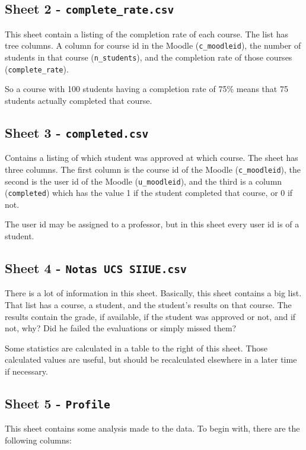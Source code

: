 \subsection{Sheet 2 - \texttt{complete\_rate.csv}}

This sheet contain a listing of the completion rate of each course. The list
has tree columns. A column for course id in the Moodle (\texttt{c\_moodleid}),
the number of students in that course (\texttt{n\_students}), and the
completion rate of those courses (\texttt{complete\_rate}).

So a course with 100 students having a completion rate of 75\% means that 75
students actually completed that course.

\subsection{Sheet 3 - \texttt{completed.csv}}

Contains a listing of which student was approved at which course. The sheet has
three columns. The first column is the course id of the Moodle
(\texttt{c\_moodleid}), the second is the user id of the Moodle
(\texttt{u\_moodleid}), and the third is a column (\texttt{completed}) which
has the value 1 if the student completed that course, or 0 if not.

The user id may be assigned to a professor, but in this sheet every user id is
of a student.

\subsection{Sheet 4 - \texttt{Notas UCS SIIUE.csv}}

There is a lot of information in this sheet. Basically, this sheet contains a
big list. That list has a course, a student, and the student's results on that
course. The results contain the grade, if available, if the student was
approved or not, and if not, why? Did he failed the evaluations or simply
missed them?

Some statistics are calculated in a table to the right of this sheet. Those
calculated values are useful, but should be recalculated elsewhere in a later
time if necessary.

\subsection{Sheet 5 - \texttt{Profile}}

This sheet contains some analysis made to the data. To begin with, there are
the following columns:

